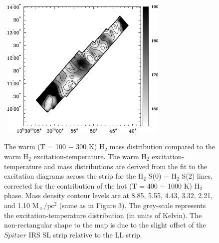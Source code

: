 \documentclass[manuscript]{aastex}
\begin{document}
\begin{figure}[!h]
\centerline{\hbox{\hspace{0.0in}
\includegraphics[width=8cm,angle=0]{bw_warm_h2_fill.jpg}}}
\caption{The warm (T = 100 $-$ 300 K) $\mathrm{H_2}$ mass distribution compared to the warm $\mathrm{H_2}$ excitation-temperature.  The warm $\mathrm{H_2}$ excitation-temperature and mass distributions are derived from the fit to the excitation diagrams across the strip for the $\mathrm{H_2}$ S(0) $-$ $\mathrm{H_2}$ S(2) lines, corrected for the contribution of the hot (T = 400 $-$ 1000 K) $\mathrm{H_2}$ phase.  Mass density contour levels are at 8.85, 5.55, 4.43, 3.32, 2.21, and 1.10 $\mathrm{M_\sun}$/$\mathrm{pc^2}$ (same as in Figure 3).
The grey-scale represents the excitation-temperature distribution (in units of Kelvin).  The non-rectangular shape to the map is due to the slight offset of the $Spitzer$ IRS SL strip relative to the LL strip.  \label{fig4}}
\end{figure}
\end{document}

